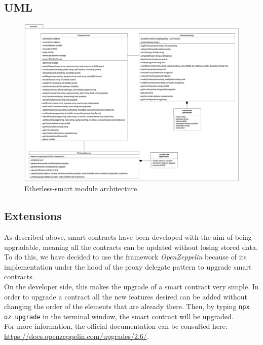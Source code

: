 	\begin{landscape}
	\subsection{UML}
		\begin{figure}[H]
			\includegraphics[width=21cm]{./diagrammi/etherless-smart/Etherless-smart.jpg}
			\caption{Etherless-smart module architecture.}
		\end{figure}
	\end{landscape}
	\restoregeometry

\subsection{Extensions}  %
As described above, smart contracts have been developed with the aim of being upgradable, meaning all the contracts can be updated without losing stored data. \\
To do this, we have decided to use the framework \textit{OpenZeppelin} because of its implementation under the hood of the proxy delegate pattern to upgrade smart contracts. \\
On the developer side, this makes the upgrade of a smart contract very simple. In order to upgrade a contract all the new features desired can be added without changing the order of the elements that are already there. Then, by typing \texttt{npx oz upgrade} in the terminal window, the smart contract will be upgraded. \\
For more information, the official documentation can be consulted here: \url{https://docs.openzeppelin.com/upgrades/2.6/}.

